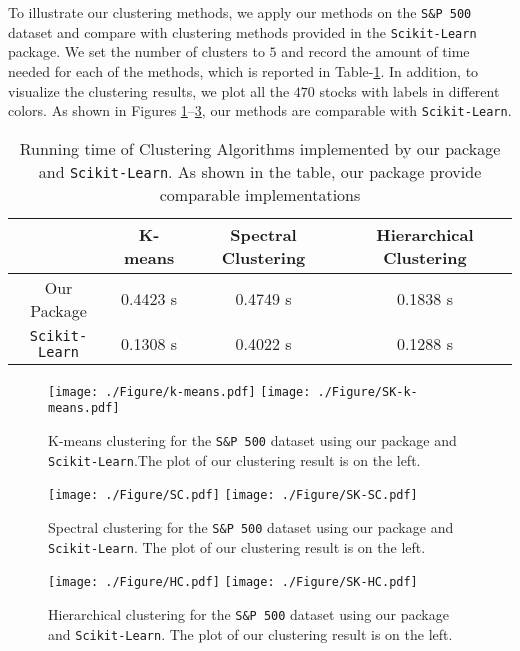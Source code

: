 
To illustrate our clustering methods, we apply our methods on the \texttt{S\&P 500} dataset and compare  with clustering methods provided in the \texttt{Scikit-Learn} package.  We set the number of clusters to $5$ and record the amount of time needed for each of the methods, which is reported in Table-\ref{tab:cluster}. In addition, to visualize the clustering results, we plot all the $470$ stocks with  labels in different colors.  As shown in Figures \ref{fig:cluster1}--\ref{fig:cluster3}, our methods are comparable with  \texttt{Scikit-Learn}.

\begin{table}[htb]
\begin{center}
\begin{tabular}{|c|c|c|c|}
\hline
& K-means &Spectral Clustering & Hierarchical Clustering \\\hline
Our Package & 0.4423 s &0.4749 s& 0.1838 s   \\\hline
\texttt{Scikit-Learn} &0.1308 s & 0.4022 s & 0.1288 s\\\hline
\end{tabular}
\end{center}
\caption{Running time of Clustering Algorithms implemented by our package and \texttt{Scikit-Learn}. As shown in the table, our package provide comparable implementations}
\label{tab:cluster}
\end{table}%

\begin{figure}[htb]
\centering
\hskip-27pt\texttt{[image: ./Figure/k-means.pdf]}
\hskip-12pt\texttt{[image: ./Figure/SK-k-means.pdf]}\\
\caption{K-means clustering for the \texttt{S\&P 500} dataset using our package and   \texttt{Scikit-Learn}.The plot of our clustering result is on the left.}
\label{fig:cluster1}
\end{figure}

\begin{figure}[htb]
\centering
\hskip-27pt\texttt{[image: ./Figure/SC.pdf]}
\hskip-12pt\texttt{[image: ./Figure/SK-SC.pdf]}\\
\caption{Spectral clustering for the \texttt{S\&P 500} dataset using our package and   \texttt{Scikit-Learn}. The plot of our clustering result is on the left.}
\label{fig:cluster2}
\end{figure}

\begin{figure}[htb]
\centering
\hskip-27pt\texttt{[image: ./Figure/HC.pdf]}
\hskip-12pt\texttt{[image: ./Figure/SK-HC.pdf]}\\
\caption{Hierarchical clustering for the \texttt{S\&P 500} dataset using our package and   \texttt{Scikit-Learn}. The plot of our clustering result is on the left.}
\label{fig:cluster3}
\end{figure}
